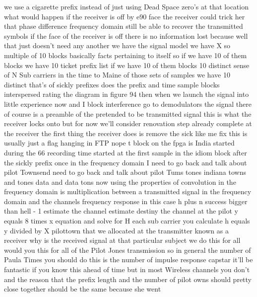 we use a cigarette prefix instead of just using Dead Space zero's at that location what would happen if the receiver is off by e90 face the receiver could trick her that phase difference frequency domain still be able to recover the transmitted symbols if the face of the receiver is off there is no information lost because well that just doesn't need any another we have the signal model we have X so multiple of 10 blocks basically facts pertaining to itself so if we have 10 of them blocks we have 10 ticket prefix list if we have 10 of them blocks 10 distinct sense of N Sub carriers in the time to Maine of those sets of samples we have 10 distinct that's of sickly prefixes does the prefix and time sample blocks interspersed rating the diagram in figure 94 then when we launch the signal into little experience now and I block interference go to demodulators the signal there of course is a preamble of the pretended to be transmitted signal this is what the receiver locks onto but for now we'll consider renovation step already complete at the receiver the first thing the receiver does is remove the sick like me fix this is usually just a flag hanging in FTP nope t block on the fpga is India started during the 66 recording time started at the first sample in the idiom block after the sickly prefix once in the frequency domain I need to go back and talk about pilot Townsend need to go back and talk about pilot Tums tones indiana towns and tones data and data tons now using the properties of convolution in the frequency domain is multiplication between a transmitted signal in the frequency domain and the channels frequency response in this case h plus n success bigger than hell - 1 estimate the channel estimate destiny the channel at the pilot y equals 8 times x equation and solve for H each sub carrier you calculate h equals y divided by X pilottown that we allocated at the transmitter known as a receiver why is the received signal at that particular subject we do this for all would you this for all of the Pilot Jones transmission so in general the number of Paula Times you should do this is the number of impulse response capstar it'll be fantastic if you know this ahead of time but in most Wireless channels you don't and the reason that the prefix length and the number of pilot owns should pretty close together should be the same because she went

